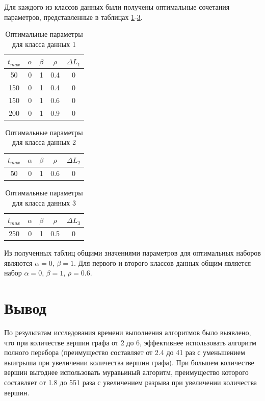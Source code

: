 \documentclass[12pt]{report}
\begin{document}
	Для каждого из классов данных были получены оптимальные сочетания параметров, представленные в таблицах \ref{tab:m1}-\ref{tab:m3}.
	
	\begin{table}[H]
		\caption{Оптимальные параметры для класса данных 1}
		\label{tab:m1}
		\begin{center}
			\begin{tabular}{|c|c|c|c|c|}
				\hline
				$t_{max}$ & $\alpha$ & $\beta$ & $\rho$ & $\Delta L_{1}$\\
				\hline
				50&0&1&0.4&0\\
				150&0&1&0.4&0\\
				150&0&1&0.6&0\\
				200&0&1&0.9&0\\
				\hline
			\end{tabular}
		\end{center}
	\end{table} 
	\begin{table}[H]
		\caption{Оптимальные параметры для класса данных 2}
		\label{tab:m2}
		\begin{center}
			\begin{tabular}{|c|c|c|c|c|}
				\hline
				$t_{max}$ & $\alpha$ & $\beta$ & $\rho$ & $\Delta L_{2}$\\
				\hline
				50&0&1&0.6&0\\
				\hline
			\end{tabular}
		\end{center}
	\end{table} 
	\begin{table}[H]
		\caption{Оптимальные параметры для класса данных 3}
		\label{tab:m3}
		\begin{center}
			\begin{tabular}{|c|c|c|c|c|}
				\hline
				$t_{max}$ & $\alpha$ & $\beta$ & $\rho$ & $\Delta L_{3}$ \\
				\hline
				250&0&1&0.5&0\\
				\hline
			\end{tabular}
		\end{center}
	\end{table} 
	
	Из полученных таблиц общими значениями параметров для оптимальных наборов являются $\alpha = 0$, $\beta = 1$. Для первого и второго классов данных общим является набор $\alpha = 0$, $\beta = 1$, $\rho = 0.6$.
	
	\section*{Вывод}
	По результатам исследования времени выполнения алгоритмов было выявлено, что при количестве вершин графа от 2 до 6, эффективнее использовать алгоритм полного перебора (преимущество составляет от 2.4 до 41 раз с уменьшением выигрыша при увеличении количества вершин графа).
	При большем количестве вершин выгоднее использовать муравьиный алгоритм, преимущество которого составляет от 1.8 до 551 раза с увеличением разрыва при увеличении количества вершин.
	
\end{document}
